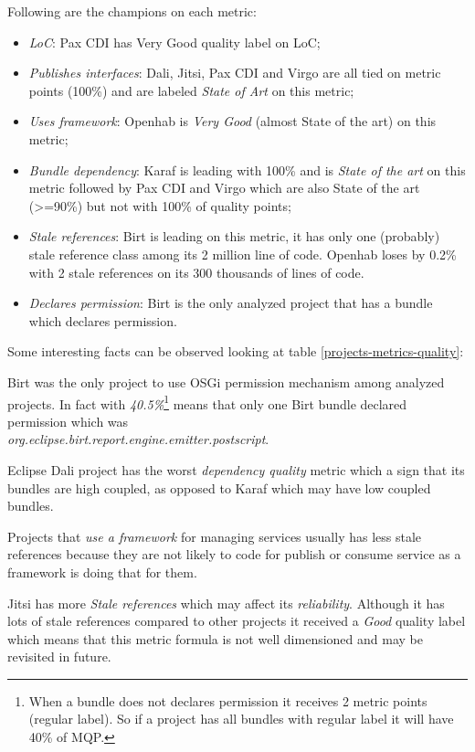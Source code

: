 Following are the champions on each metric:


\begin{itemize}
\item \emph{LoC}: Pax CDI has Very Good quality label on LoC;
\item \emph{Publishes interfaces}: Dali, Jitsi, Pax CDI and Virgo are all tied on metric points (100\%) and are labeled \emph{State of Art} on this metric;
\item \emph{Uses framework}: Openhab is \emph{Very Good} (almost State of the art) on this metric;
\item \emph{Bundle dependency}: Karaf is leading with 100\% and is \emph{State of the art} on this metric followed by Pax CDI and Virgo which are also State of the art (>=90\%) but not with 100\% of quality points;  
\item \emph{Stale references}: Birt is leading on this metric, it has only one (probably) stale reference class among its 2 million line of code. Openhab loses by 0.2\% with 2 stale references on its 300 thousands of lines of code.  
\item \emph{Declares permission}: Birt is the only analyzed project that has a bundle which declares permission.
\end{itemize}

Some interesting facts can be observed looking at table \ref{projects-metrics-quality}:

Birt was the only project to use OSGi permission mechanism among analyzed projects. In fact with \emph{40.5\%}\footnote{When a bundle does not declares permission it receives 2 metric points (regular label). So if a project has all bundles with regular label it will have 40\% of MQP.} means that only one Birt bundle declared permission which was \\\emph{org.eclipse.birt.report.engine.emitter.postscript}.

Eclipse Dali project has the worst \emph{dependency quality} metric which a sign that its bundles are high coupled, as opposed to Karaf which may have low coupled bundles.

Projects that \emph{use a framework} for managing services usually has less stale references because they are not likely to code for publish or consume service as a framework is doing that for them.

Jitsi has more \emph{Stale references} which may affect its \emph{reliability}. Although it has lots of stale references compared to other projects it received a \emph{Good} quality label which means that this metric formula is not well dimensioned and may be revisited in future.    

